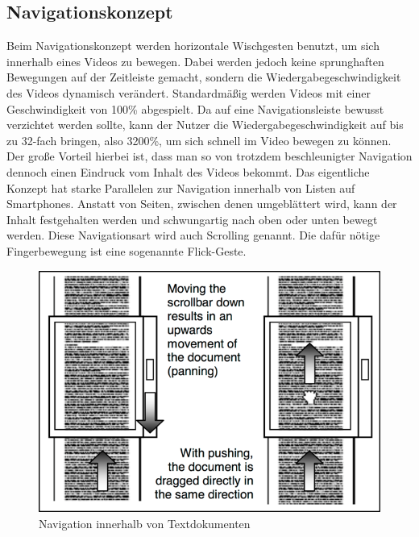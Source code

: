 \documentclass[11pt,a4paper]{report}
\begin{document}
\subsection{Navigationskonzept}

Beim Navigationskonzept werden horizontale Wischgesten benutzt, um sich innerhalb eines Videos zu bewegen. Dabei werden jedoch keine sprunghaften Bewegungen auf der Zeitleiste gemacht, sondern die Wiedergabegeschwindigkeit des Videos dynamisch verändert. Standardmäßig werden Videos mit einer Geschwindigkeit von 100\% abgespielt. Da auf eine Navigationsleiste bewusst verzichtet werden sollte, kann der Nutzer die Wiedergabegeschwindigkeit auf bis zu 32-fach bringen, also 3200\%, um sich schnell im Video bewegen zu können. Der große Vorteil hierbei ist, dass man so von trotzdem beschleunigter Navigation dennoch einen Eindruck vom Inhalt des Videos bekommt. Das eigentliche Konzept hat starke Parallelen zur Navigation innerhalb von Listen auf Smartphones. Anstatt von Seiten, zwischen denen umgeblättert wird, kann der Inhalt festgehalten werden und schwungartig nach oben oder unten bewegt werden. Diese Navigationsart wird auch Scrolling genannt. Die dafür nötige Fingerbewegung ist eine sogenannte Flick-Geste.
\begin{figure}[h]
\begin{center}
\includegraphics[scale=1.1]{./images/16.png}
\caption{Navigation innerhalb von Textdokumenten \cite{hurst2008interfaces}}
\label{scrolling_text}
\end{center}
\end{figure}
\end{document}
